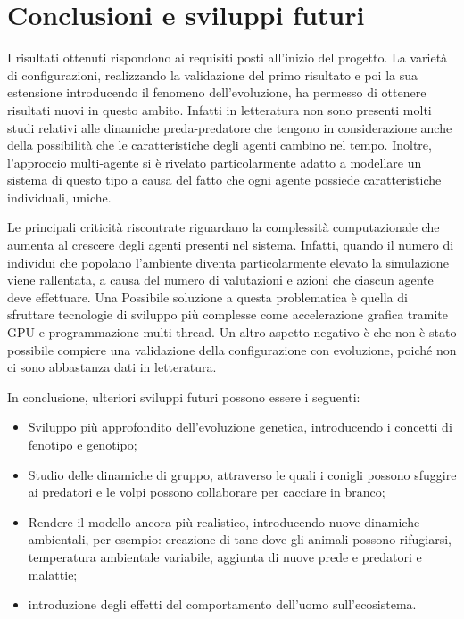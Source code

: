 \documentclass[11pt]{article}
\begin{document}
\newpage 

\section{Conclusioni e sviluppi futuri}
I risultati ottenuti rispondono ai requisiti posti all'inizio del progetto. La varietà di configurazioni, realizzando la validazione del primo risultato e poi la sua estensione introducendo il fenomeno dell'evoluzione, ha permesso di ottenere risultati nuovi in questo ambito. Infatti in letteratura non sono presenti molti studi relativi alle dinamiche preda-predatore che tengono in considerazione anche della possibilità che le caratteristiche degli agenti cambino nel tempo. Inoltre, l'approccio multi-agente si è rivelato particolarmente adatto a modellare un sistema di questo tipo a causa del fatto che ogni agente possiede caratteristiche individuali, uniche.

Le principali criticità riscontrate riguardano la complessità computazionale che aumenta al crescere degli agenti presenti nel sistema. Infatti, quando il numero di individui che popolano l'ambiente diventa particolarmente elevato la simulazione viene rallentata, a causa del numero di valutazioni e azioni che ciascun agente deve effettuare. Una Possibile soluzione a questa problematica è quella di sfruttare tecnologie di sviluppo più complesse come accelerazione grafica tramite GPU e programmazione multi-thread.
Un altro aspetto negativo è che non è stato possibile compiere una validazione della configurazione con evoluzione, poiché non ci sono abbastanza dati in letteratura. 

In conclusione, ulteriori sviluppi futuri possono essere i seguenti: 
\begin{itemize}
    \item Sviluppo più approfondito dell'evoluzione genetica, introducendo i concetti di fenotipo e genotipo;
    \item Studio delle dinamiche di gruppo, attraverso le quali i conigli possono sfuggire ai predatori e le volpi possono collaborare per cacciare in branco;
    \item Rendere il modello ancora più realistico, introducendo nuove dinamiche ambientali, per esempio: creazione di tane dove gli animali possono rifugiarsi, temperatura ambientale variabile, aggiunta di nuove prede e predatori e malattie;
    \item introduzione degli effetti del comportamento dell'uomo sull'ecosistema.
\end{itemize}




\newpage
\printbibliography	
\end{document}
